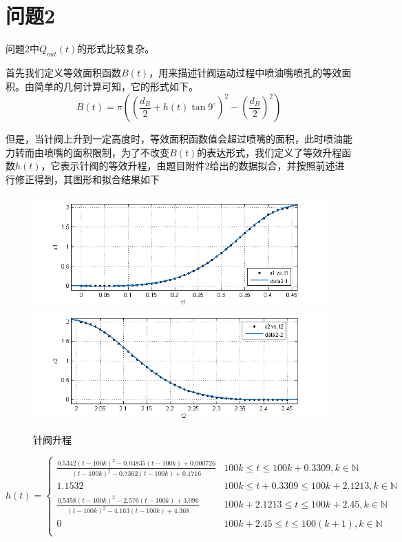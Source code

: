 \documentclass[12pt,AutoFakeBold]{article}%
\begin{document}
    \section{问题2}
    问题2中$Q_{out}(t)$的形式比较复杂。\par
    首先我们定义等效面积函数$B(t)$，用来描述针阀运动过程中喷油嘴喷孔的等效面积。由简单的几何计算可知，它的形式如下。
    \begin{equation}
        B(t)=\pi\left(\left(\frac{d_B}{2}+h(t)\tan9^\circ\right)^2-\left(\frac{d_B}{2}\right)^2\right)
    \end{equation}\par
    但是，当针阀上升到一定高度时，等效面积函数值会超过喷嘴的面积，此时喷油能力转而由喷嘴的面积限制，为了不改变$B(t)$的表达形式，我们定义了等效升程函数$h(t)$，它表示针阀的等效升程，由题目附件2给出的数据拟合，并按照前述进行修正得到，其图形和拟合结果如下
    \begin{figure}[H]
        \centering
        \includegraphics[scale=0.8]{figure/data21.png}
        \includegraphics[scale=0.8]{figure/data22.png}
        \caption{针阀升程}
        \label{zhenfa}
    \end{figure}
    \begin{equation}
        h(t)=
        \begin{cases}
            \frac{0.5342(t-100k)^2-0.04835(t-100k)+0.000726}{(t-100k)^2-0.7362(t-100k)+0.1716}&100k\leq t\leq 100k+0.3309,k\in\mathbb{N}\\
            1.1532&100k\leq t+0.3309\leq 100k+2.1213,k\in\mathbb{N}\\
            \frac{0.5358(t-100k)^2-2.576(t-100k)+3.096}{(t-100k)^2-4.163(t-100k)+4.368}&100k+2.1213\leq t\leq 100k+2.45,k\in\mathbb{N}\\
            0&100k+2.45\leq t\leq 100(k+1),k\in\mathbb{N}\\      
        \end{cases}
    \end{equation}
\end{document}
